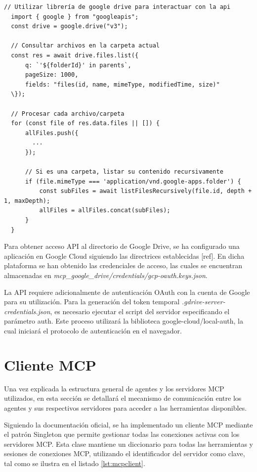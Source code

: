 \begin{itemize}
\begin{lstlisting}[caption={index\_mod.js: herramienta gdrive\_list\_files utilizando la API de Google Drive},label={lst:mcpgd}]
  // Utilizar librería de google drive para interactuar con la api
  import { google } from "googleapis";
  const drive = google.drive("v3"); 

  // Consultar archivos en la carpeta actual
  const res = await drive.files.list({
      q: `'${folderId}' in parents`,
      pageSize: 1000,
      fields: "files(id, name, mimeType, modifiedTime, size)"
  \});

  // Procesar cada archivo/carpeta
  for (const file of res.data.files || []) {
      allFiles.push({
        ...
      });
      
      // Si es una carpeta, listar su contenido recursivamente
      if (file.mimeType === 'application/vnd.google-apps.folder') {
          const subFiles = await listFilesRecursively(file.id, depth + 1, maxDepth);
          allFiles = allFiles.concat(subFiles);
      }
  }
\end{lstlisting}
Para obtener acceso API al directorio de Google Drive, se ha configurado una aplicación en Google Cloud siguiendo las directrices establecidas [ref]. En dicha plataforma se han obtenido las credenciales de acceso, las cuales se encuentran almacenadas en \textit{mcp\_google\_drive/credentials/gcp-oauth.keys.json}.

La API requiere adicionalmente de autenticación OAuth con la cuenta de Google para su utilización. Para la generación del token temporal \textit{.gdrive-server-credentials.json}, es necesario ejecutar el script del servidor especificando el parámetro auth. Este proceso utilizará la biblioteca google-cloud/local-auth, la cual iniciará el protocolo de autenticación en el navegador.

\end{itemize}

\section{Cliente MCP}
\label{sec:gestionmcp}
Una vez explicada la estructura general de agentes y los servidores MCP utilizados, en esta sección se detallará el mecanismo de comunicación entre los agentes y sus respectivos servidores para acceder a las herramientas disponibles.

Siguiendo la documentación oficial, se ha implementado un cliente MCP mediante el patrón Singleton que permite gestionar todas las conexiones activas con los servidores MCP. Esta clase mantiene un diccionario para todas las herramientas y sesiones de conexiones MCP, utilizando el identificador del servidor como clave, tal como se ilustra en el listado \ref{lst:mcpclient}.


